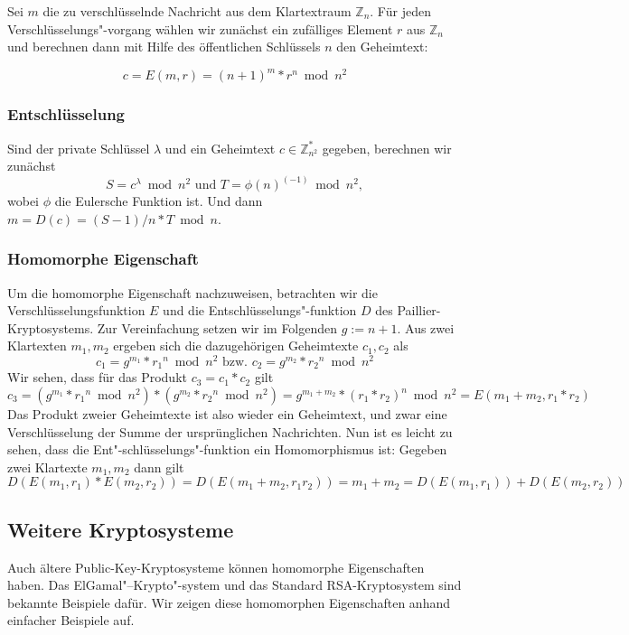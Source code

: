 \begin{refsegment}
Sei $m$ die zu verschlüsselnde Nachricht aus dem Klartextraum $\mathbb{Z}_n$. Für jeden Verschlüsselungs"-vorgang wählen wir zunächst ein zufälliges Element $r$ aus $\mathbb{Z}_n$ und berechnen dann mit Hilfe des öffentlichen Schlüssels $n$ den Geheimtext:

$$c = E(m,r) = (n+1)^m  * r^n  \bmod n^2$$

\subsubsection{Entschlüsselung}

Sind der private Schlüssel $\lambda$ und ein Geheimtext $c \in \mathbb{Z}_{n^2}^*$ gegeben, berechnen wir zunächst
$$S = c^\lambda \bmod n^2 \mbox{ und } T = \phi(n)^{(-1)} \bmod n^2,$$
wobei $\phi$ die Eulersche Funktion ist.
Und dann $m = D(c) = (S-1)/n * T \bmod n$.

\subsubsection{Homomorphe Eigenschaft}

Um die homomorphe Eigenschaft nachzuweisen, betrachten wir die Verschlüsselungsfunktion $E$ und die Entschlüsselungs"-funktion $D$ des Paillier-Kryptosystems. Zur Vereinfachung setzen wir im Folgenden $g:= n+1$.  Aus zwei Klartexten $m_1,m_2$ ergeben sich die dazugehörigen Geheimtexte $c_1, c_2$ als
$$c_1 = g^{m_1} *  {r_1}^n \bmod n^2 \mbox{ bzw. } c_2 = g^{m_2} * {r_2}^n \bmod n^2$$
Wir sehen, dass für das Produkt $c_3 = c_1 * c_2$ gilt
$$c_3 = (g^{m_1} * {r_1}^n \bmod n^2) * (g^{m_2} * {r_2}^n \bmod n^2) = g^{m_1+m_2} * (r_1*r_2 )^n \bmod n^2 = E(m_1 + m_2, r_1*r_2)$$
Das Produkt zweier Geheimtexte ist also wieder ein Geheimtext, und zwar eine Verschlüsselung der Summe der ursprünglichen Nachrichten. Nun ist es leicht zu sehen, dass die Ent"-schlüsselungs"-funktion ein Homomorphismus ist:
Gegeben zwei Klartexte $m_1, m_2$ dann gilt
$$D( E(m_1,r_1) * E(m_2,r_2)) = D( E(m_1+m_2, r_1 r_2)) = m_1  + m_2 = D(E(m_1,r_1)) + D(E(m_2,r_2))$$

\subsection{Weitere Kryptosysteme}

Auch ältere Public-Key-Kryptosysteme können homomorphe Eigenschaften haben. Das ElGamal"--Krypto"-system und das Standard RSA-Kryptosystem sind bekannte Beispiele dafür. Wir zeigen diese homomorphen Eigenschaften anhand einfacher Beispiele auf.


\end{refsegment}
